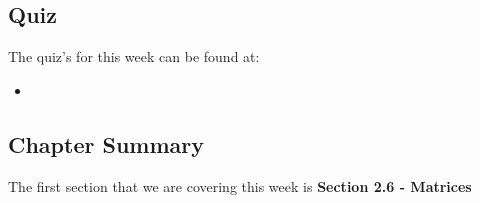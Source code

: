 \subsection{Quiz}

The quiz's for this week can be found at:

\begin{itemize}
    \item {}
\end{itemize}

\subsection{Chapter Summary}

The first section that we are covering this week is \textbf{Section 2.6 - Matrices}

